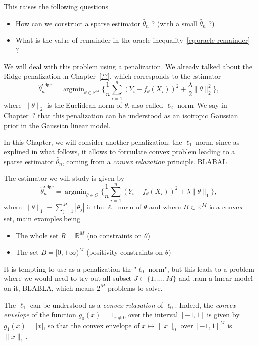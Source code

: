 \documentclass[
	fontsize=11pt, %
	twoside=false, %
	numbers=noenddot, %
]{kaobook}
\DeclareMathOperator*{\argmin}{argmin}
\newcommand{\R}{\mathbb R}
\newcommand{\wh}{\widehat}
\newcommand{\norm}[1]{\| #1 \|}
\begin{document}
This raises the following questions
\begin{itemize}
	\item How can we construct a sparse estimator $\wh \theta_n$ ? (with a small $\wh \theta_n$ ?)
	\item What is the value of $\text{remainder}$ in the oracle inequality~\eqref{eq:oracle-remainder} ?
\end{itemize}
We will deal with this problem using a penalization.
We already talked about the Ridge penalization in Chapter~\ref{??}, which corresponds to the estimator
\begin{equation}
	\label{eq:chap-lasso-ridge-estimator}
	\wh \theta_n^{\mathsf{ridge}} = \argmin_{\theta \in \R^M} 
	\Big\{ \frac 1n \sum_{i=1}^n (Y_i - f_\theta(X_i))^2 + \frac{\lambda}{2} \norm{\theta}_2^2 \Big\},
\end{equation}
where $\norm{\theta}_2$ is the Euclidean norm of $\theta$, also called $\ell_2$ norm.
We say in Chapter~? that this penalization can be understood as an isotropic Gaussian prior in the Gaussian linear model.

In this Chapter, we will consider another penalization: the $\ell_1$ norm, since as explined in what follows, it allows to formulate convex problem leading to a sparse estimator $\wh \theta_n$, coming from a \emph{convex relaxation} principle. BLABAL

The estimator we will study is given by
\begin{equation}
	\label{eq:lasso-def}
		\wh \theta_n^{\mathsf{ridge}} = \argmin_{\theta \in \Theta} 
		\Big\{ \frac 1n \sum_{i=1}^n (Y_i - f_\theta(X_i))^2 + \lambda \norm{\theta}_1 \Big\},
\end{equation}
where $\norm{\theta}_1 = \sum_{j=1}^M |\theta_j|$ is the $\ell_1$ norm of $\theta$ and where $B \subset \R^M$ is a convex set, main examples being
\begin{itemize}
 	\item The whole set $B = \R^M$ (no constraints on $\theta$)
 	\item The set $B = [0, +\infty)^M$ (positivity constraints on $\theta$)
 \end{itemize} 

It is tempting to use as a penalization the "$\ell_0$ norm", but this leads to a problem where we would need to try out all subset $J \subset \{ 1, \ldots, M \}$ and train a linear model on it, BLABLA, which means $2^M$ problems to solve.

The $\ell_1$ can be understood as a \emph{convex relaxation} of $\ell_0$.
Indeed, the \emph{convex envelope}%
of the function $g_0(x) = 1_{x \neq 0}$ over the interval $[-1, 1]$ is given by $g_1(x) = |x|$, so that the convex envelope of $x \mapsto \norm{x}_0$ over $[-1, 1]^M$ is $\norm{x}_1$.
\end{document}
